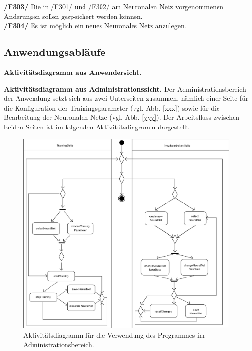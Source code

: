 \textbf{/F303/} Die in /F301/ und /F302/ am Neuronalen Netz vorgenommenen Änderungen sollen gespeichert werden können.\\[-0.2cm]

\textbf{/F304/} Es ist möglich ein neues Neuronales Netz anzulegen.\\[-0.2cm]


\subsection{Anwendungsabläufe}

\textbf{Aktivitätsdiagramm aus Anwendersicht.}

\textbf{Aktivitätsdiagramm aus Administrationssicht.} Der Administrationsbereich der Anwendung setzt sich aus zwei Unterseiten zusammen, nämlich einer Seite für die Konfiguration der Trainingsparameter (vgl. Abb. \ref{xxx}) sowie für die Bearbeitung der Neuronalen Netze (vgl. Abb. \ref{yyy}). Der Arbeitsfluss zwischen beiden Seiten ist im folgenden Aktivitätsdiagramm dargestellt.

\begin{figure}[H]
\begin{center}
\includegraphics[width=\textwidth]{Abbildungen/UML/jan/trainingConfigAD.png}
\caption{Aktivitätsdiagramm für die Verwendung des Programmes im Administrationsbereich.}
\label{fig_trainingConfigAD}
\end{center}
\end{figure}


